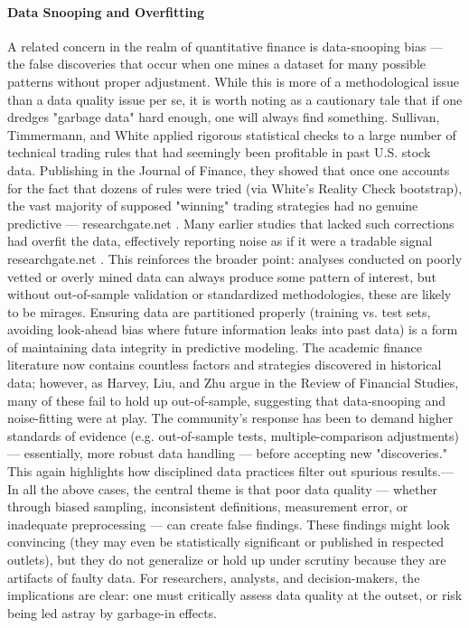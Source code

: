 \documentclass{article}
\begin{document}
\begin{appendices}
\paragraph{Data Snooping and Overfitting}
A related concern in the realm of quantitative finance is data-snooping bias --- the false discoveries that occur when one mines a dataset for many possible patterns without proper adjustment. While this is more of a methodological issue than a data quality issue per se, it is worth noting as a cautionary tale that if one dredges "garbage data" hard enough, one will always find something. Sullivan, Timmermann, and White \cite{Sullivan1999} applied rigorous statistical checks to a large number of technical trading rules that had seemingly been profitable in past U.S. stock data. Publishing in the Journal of Finance, they showed that once one accounts for the fact that dozens of rules were tried (via White's Reality Check bootstrap), the vast majority of supposed "winning" trading strategies had no genuine predictive ---
researchgate.net
. Many earlier studies that lacked such corrections had overfit the data, effectively reporting noise as if it were a tradable signal
researchgate.net
. This reinforces the broader point: analyses conducted on poorly vetted or overly mined data can always produce some pattern of interest, but without out-of-sample validation or standardized methodologies, these are likely to be mirages. Ensuring data are partitioned properly (training vs. test sets, avoiding look-ahead bias where future information leaks into past data) is a form of maintaining data integrity in predictive modeling. The academic finance literature now contains countless factors and strategies discovered in historical data; however, as Harvey, Liu, and Zhu \cite{Harvey2016} argue in the Review of Financial Studies, many of these fail to hold up out-of-sample, suggesting that data-snooping and noise-fitting were at play. The community's response has been to demand higher standards of evidence (e.g. out-of-sample tests, multiple-comparison adjustments) --- essentially, more robust data handling --- before accepting new "discoveries." This again highlights how disciplined data practices filter out spurious results.---
In all the above cases, the central theme is that poor data quality --- whether through biased sampling, inconsistent definitions, measurement error, or inadequate preprocessing --- can create false findings. These findings might look convincing (they may even be statistically significant or published in respected outlets), but they do not generalize or hold up under scrutiny because they are artifacts of faulty data. For researchers, analysts, and decision-makers, the implications are clear: one must critically assess data quality at the outset, or risk being led astray by garbage-in effects.


\end{appendices}



\end{document}

